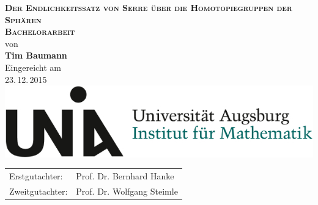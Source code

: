 
\begin{titlepage}
  \vspace*{\fill}
  \begin{center}
    \Huge \textbf{\textsc{Der Endlichkeitssatz von Serre über die Homotopiegruppen der Sphären}} \vspace{0.2cm}\\
    \vspace{2cm}
    \LARGE \textbf{\textsc{Bachelorarbeit}}\\
    von\\
    \textbf{Tim Baumann}\\
    \vspace{2.2cm}
    \large Eingereicht am \\
    23.\,12.\,2015 \\[1cm]
    \includegraphics[scale=0.4]{uni_aux_logo.jpg} \\[1cm]
    \vspace{1.2cm}
    \large \begin{tabular}{ll}
      Erstgutachter: & Prof. Dr. Bernhard Hanke \\
      Zweitgutachter: & Prof. Dr. Wolfgang Steimle
    \end{tabular}
  \end{center}
  \vspace*{\fill}
\end{titlepage}
